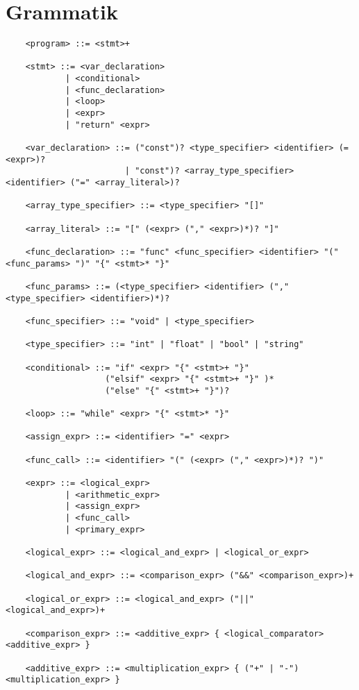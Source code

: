 \documentclass{TDP003mall}
\begin{document}
    \section{Grammatik}
    \begin{verbatim}
    <program> ::= <stmt>+

    <stmt> ::= <var_declaration> 
            | <conditional>
            | <func_declaration>
            | <loop>
            | <expr>
            | "return" <expr>

    <var_declaration> ::= ("const")? <type_specifier> <identifier> (= <expr>)?
                        | "const")? <array_type_specifier> <identifier> ("=" <array_literal>)?

    <array_type_specifier> ::= <type_specifier> "[]"

    <array_literal> ::= "[" (<expr> ("," <expr>)*)? "]"

    <func_declaration> ::= "func" <func_specifier> <identifier> "(" <func_params> ")" "{" <stmt>* "}"

    <func_params> ::= (<type_specifier> <identifier> ("," <type_specifier> <identifier>)*)? 

    <func_specifier> ::= "void" | <type_specifier>

    <type_specifier> ::= "int" | "float" | "bool" | "string"

    <conditional> ::= "if" <expr> "{" <stmt>+ "}"
                    ("elsif" <expr> "{" <stmt>+ "}" )*
                    ("else" "{" <stmt>+ "}")?

    <loop> ::= "while" <expr> "{" <stmt>* "}"

    <assign_expr> ::= <identifier> "=" <expr>

    <func_call> ::= <identifier> "(" (<expr> ("," <expr>)*)? ")"

    <expr> ::= <logical_expr> 
            | <arithmetic_expr> 
            | <assign_expr>
            | <func_call>
            | <primary_expr>

    <logical_expr> ::= <logical_and_expr> | <logical_or_expr>

    <logical_and_expr> ::= <comparison_expr> ("&&" <comparison_expr>)+

    <logical_or_expr> ::= <logical_and_expr> ("||" <logical_and_expr>)+

    <comparison_expr> ::= <additive_expr> { <logical_comparator> <additive_expr> }

    <additive_expr> ::= <multiplication_expr> { ("+" | "-") <multiplication_expr> }


\end{verbatim}
\end{document}
